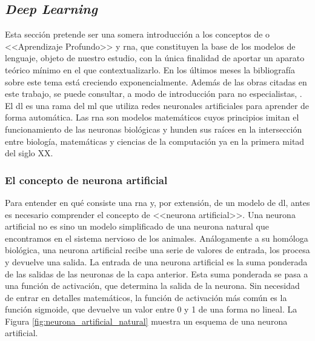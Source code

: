 \subsection{\textit{Deep Learning}}

Esta sección pretende ser una somera introducción a los conceptos de  o <<Aprendizaje Profundo>> y \gls{rna}, que constituyen la base de los modelos de lenguaje, objeto de nuestro estudio, con la única finalidad de aportar un aparato teórico mínimo en el que contextualizarlo. En los últimos meses la bibliografía sobre este tema está creciendo exponencialmente. Además de las obras citadas en este trabajo, se puede consultar, a modo de introducción para no especialistas, \cite{BeginnerGuideNeural}. El \gls{dl} es una rama del \gls{ml} que utiliza redes neuronales artificiales para aprender de forma automática. Las \gls{rna} son modelos matemáticos cuyos principios imitan el funcionamiento de las neuronas biológicas y hunden sus raíces en la intersección entre biología, matemáticas y ciencias de la computación ya en la primera mitad del siglo XX.

\subsubsection{El concepto de neurona artificial}

Para entender en qué consiste una \gls{rna} y, por extensión, de un modelo de \gls{dl}, antes es necesario comprender el concepto de <<neurona artificial>>. Una neurona artificial no es sino un modelo simplificado de una neurona natural que encontramos en el sistema nervioso de los animales. Análogamente a su homóloga biológica, una neurona artificial recibe una serie de valores de entrada, los procesa y devuelve una salida. La entrada de una neurona artificial es la suma ponderada de las salidas de las neuronas de la capa anterior. Esta suma ponderada se pasa a una función de activación, que determina la salida de la neurona. Sin necesidad de entrar en detalles matemáticos, la función de activación más común es la función sigmoide, que devuelve un valor entre 0 y 1 de una forma no lineal. La Figura \ref{fig:neurona_artificial_natural} muestra un esquema de una neurona artificial. 

